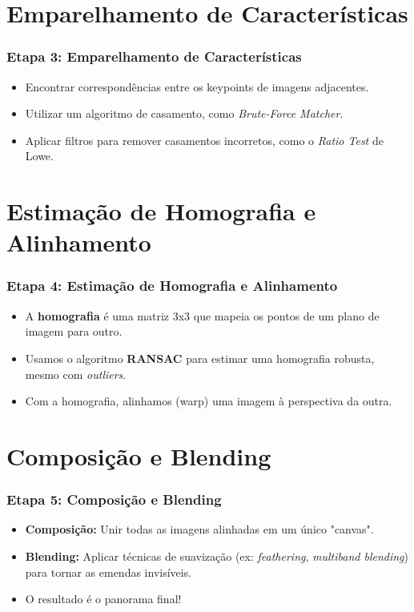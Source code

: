 \documentclass{beamer}
\begin{document}
\section{Emparelhamento de Características}
\begin{frame}
  \frametitle{Etapa 3: Emparelhamento de Características}
  \begin{itemize}
    \item<1-> Encontrar correspondências entre os keypoints de imagens adjacentes.
    \item<2-> Utilizar um algoritmo de casamento, como \textit{Brute-Force Matcher}.
    \item<3-> Aplicar filtros para remover casamentos incorretos, como o \textit{Ratio Test} de Lowe.
  \end{itemize}
\end{frame}

\section{Estimação de Homografia e Alinhamento}
\begin{frame}
  \frametitle{Etapa 4: Estimação de Homografia e Alinhamento}
  \begin{itemize}
    \item<1-> A \textbf{homografia} é uma matriz 3x3 que mapeia os pontos de um plano de imagem para outro.
    \item<2-> Usamos o algoritmo \textbf{RANSAC} para estimar uma homografia robusta, mesmo com \textit{outliers}.
    \item<3-> Com a homografia, alinhamos (warp) uma imagem à perspectiva da outra.
  \end{itemize}
\end{frame}

\section{Composição e Blending}
\begin{frame}
  \frametitle{Etapa 5: Composição e Blending}
  \begin{itemize}
    \item<1-> \textbf{Composição:} Unir todas as imagens alinhadas em um único "canvas".
    \item<2-> \textbf{Blending:} Aplicar técnicas de suavização (ex: \textit{feathering}, \textit{multiband blending}) para tornar as emendas invisíveis.
    \item<3-> O resultado é o panorama final!
  \end{itemize}
\end{frame}
\end{document}
